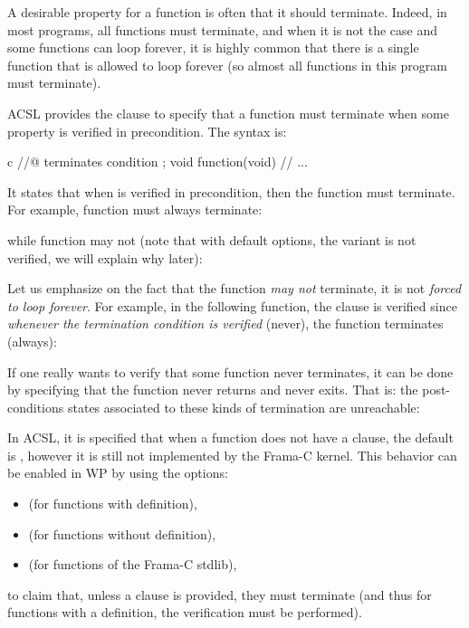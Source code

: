 A desirable property for a function is often that it should terminate. Indeed,
in most programs, all functions must terminate, and when it is not the case and
some functions can loop forever, it is highly common that there is a single
function that is allowed to loop forever (so almost all functions in this
program must terminate).




ACSL provides the  clause to specify that a function must
terminate when some property is verified in precondition. The syntax is:


\begin{CodeBlock}{c}
//@ terminates condition ;
void function(void){
  // ...
}
\end{CodeBlock}


It states that when  is verified in precondition, then
the function must terminate. For example, function  must always
terminate:




while function  may not (note that with default options,
the variant is not verified, we will explain why later):




Let us emphasize on the fact that the function {\em may not} terminate, it is
not {\em forced to loop forever}. For example, in the following function, the
 clause is verified since
{\em whenever the termination condition is verified} (never), the function
terminates (always):




\begin{Information}
  If one really wants to verify that some function never terminates, it can be
  done by specifying that the function never returns and never exits. That is:
  the post-conditions states associated to these kinds of termination are
  unreachable:
\end{Information}


\begin{Information}
  In ACSL, it is specified that when a function does not have a
   clause, the default is
  , however it is still not
  implemented by the Frama-C kernel. This behavior can be enabled in WP
  by using the options:
  \begin{itemize}
  \item {} (for functions with definition),
  \item {} (for functions without definition),
  \item {} (for functions of the Frama-C stdlib),
  \end{itemize}
  to claim that, unless a clause is provided, they must terminate (and thus
  for functions with a definition, the verification must be performed).
\end{Information}


